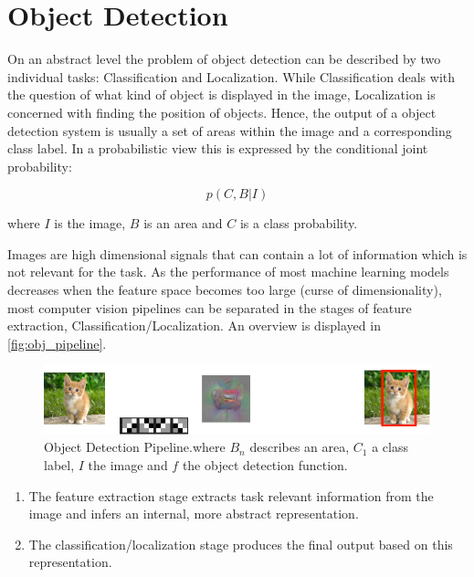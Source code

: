	\chapter{Object Detection}
	
	\label{sec:object_detection}
	
On an abstract level the problem of object detection can be described by two individual tasks: Classification and Localization. While Classification deals with the question of what kind of object is displayed in the image, Localization is concerned with finding the position of objects. Hence, the output of a object detection system is usually a set of areas within the image and a corresponding class label. In a probabilistic view this is expressed by the conditional joint probability:

	\begin{equation}
		p(C,B|I)
	\end{equation}

	where $I$ is the image, $B$ is an area and $C$ is a class probability.

	Images are high dimensional signals that can contain a lot of information which is not relevant for the task. As the performance of most machine learning models decreases when the feature space becomes too large (curse of dimensionality), most computer vision pipelines can be separated in the stages of feature extraction, Classification/Localization. An overview is displayed in \autoref{fig:obj_pipeline}.
	
	\begin{figure}[hbtp]
	
	\centering
	\includegraphics[width=\linewidth]{fig/ObjectDetection}
	\caption{Object Detection Pipeline.where $B_n$ describes an area, $C_1$ a class label, $I$ the image and $f$ the object detection function.}
	\label{fig:obj_pipeline}
	
	\end{figure}

	\begin{enumerate}
	\item The feature extraction stage extracts task relevant information from the image and infers an internal, more abstract representation.

	\item The classification/localization stage produces the final output based on this representation.

	\end{enumerate}

